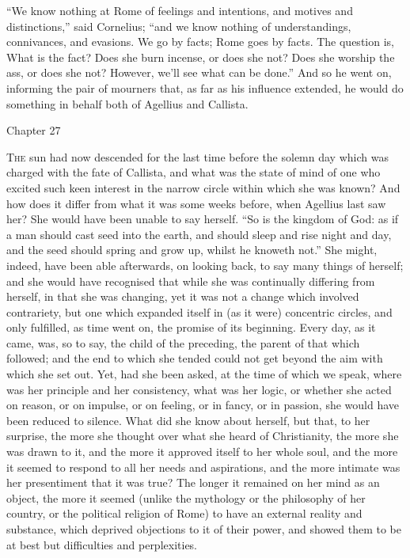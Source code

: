 ``We know nothing at Rome of feelings and intentions, and
motives and distinctions,'' said Cornelius; ``and we know
nothing of understandings, connivances, and evasions. We go by facts;
Rome goes by facts. The question is, What is the fact? Does she burn
incense, or does she not? Does she worship the ass, or does she not?
However, we'll see what can be done.'' And so he went on,
informing the pair of mourners that, as far as his influence extended,
he would do something in behalf both of Agellius and Callista.

Chapter 27


T\textsc{he} sun had now descended for the last time before the solemn
day which was charged with the fate of Callista, and what was the
state of mind of one who excited such keen interest in the narrow
circle within which she was known? And how does it differ from what it
was some weeks before, when Agellius last saw her? She would have been
unable to say herself. ``So is the kingdom of God: as if a man
should cast seed into the earth, and should sleep and rise night and
day, and the seed should spring and grow up, whilst he knoweth
not.'' She might, indeed, have been able afterwards, on looking
back, to say many things of herself; and she would have recognised
that while she was continually differing from herself, in that she was
changing, yet it was not a change which involved contrariety, but one
which expanded itself in (as it were) concentric circles, and only
fulfilled, as time went on, the promise of its beginning. Every day,
as it came, was, so to say, the child of the preceding, the parent of
that which followed; and the end to which she tended could not get
beyond the aim with which she set out. Yet, had she been asked, at the time of which we speak, where was her principle and her
consistency, what was her logic, or whether she acted on reason, or on
impulse, or on feeling, or in fancy, or in passion, she would have
been reduced to silence. What did she know about herself, but that, to
her surprise, the more she thought over what she heard of
Christianity, the more she was drawn to it, and the more it approved
itself to her whole soul, and the more it seemed to respond to all her
needs and aspirations, and the more intimate was her presentiment that
it was true? The longer it remained on her mind as an object, the more
it seemed (unlike the mythology or the philosophy of her country, or
the political religion of Rome) to have an external reality and
substance, which deprived objections to it of their power, and showed
them to be at best but difficulties and perplexities.

